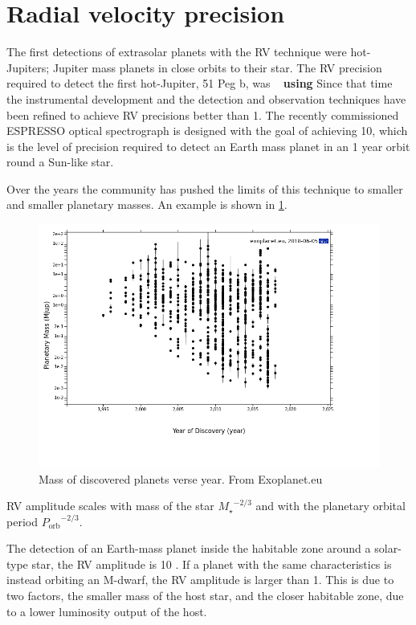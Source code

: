 
\section{Radial velocity precision}
\label{section:rv_precision}
The first detections of extrasolar planets with the {RV} technique were hot-Jupiters; Jupiter mass planets in close orbits to their star.
The RV precision required to detect the first hot-Jupiter, 51 Peg b, was ~\cite{mayor_jupitermass_1995} \textbf{using } Since that time the instrumental development and the detection and observation techniques have been refined to achieve {RV} precisions better than 1\mps{}.
The recently commissioned ESPRESSO optical spectrograph is designed with the goal of achieving 10\cmps{}, which is the level of precision required to detect an Earth mass planet in an 1 year orbit round a Sun-like star.

Over the years the community has pushed the limits of this technique to smaller and smaller planetary masses.
An example is shown in \cref{fig:year_mass}.

\begin{figure}
    \includegraphics[width=0.8\linewidth]{figures/year_planet_mass.png}
    \caption{Mass of discovered planets verse year.
        From Exoplanet.eu}
    \label{fig:year_mass}
\end{figure}


{RV} amplitude scales with mass of the star \({M_{\star}}^{-2/3}\) and with the planetary orbital period \({P_{\textrm{orb}}}^{-2/3}\).

The detection of an Earth-mass planet inside the habitable zone around a solar-type star, the {RV} amplitude is 10 \cmps{}.
If a planet with the same characteristics is instead orbiting an {M-dwarf}, the {RV} amplitude is larger than 1\mps{}.
This is due to two factors, the smaller mass of the host star, and the closer habitable zone, due to a lower luminosity output of the host.

